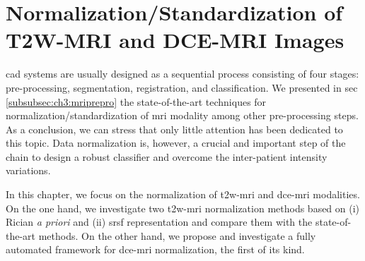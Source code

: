 \chapter{Normalization/Standardization of T2W-MRI and DCE-MRI Images} \label{chap:5}
\Ac{cad} systems are usually designed as a sequential process consisting of four stages: pre-processing, segmentation, registration, and classification.
We presented in \acs{sec}\,\ref{subsubsec:ch3:mriprepro} the state-of-the-art techniques for normalization/standardization of \ac{mri} modality among other pre-processing steps.
As a conclusion, we can stress that only little attention has been dedicated to this topic.
Data normalization is, however, a crucial and important step of the chain to design a robust classifier and overcome the inter-patient intensity variations.

In this chapter, we focus on the normalization of \ac{t2w}-\ac{mri} and \ac{dce}-\ac{mri} modalities.
On the one hand, we investigate two \ac{t2w}-\ac{mri} normalization methods based on (i) Rician \emph{a priori} and (ii) \ac{srsf} representation and compare them with the state-of-the-art methods.
On the other hand, we propose and investigate a fully automated framework for \ac{dce}-\ac{mri} normalization, the first of its kind.





